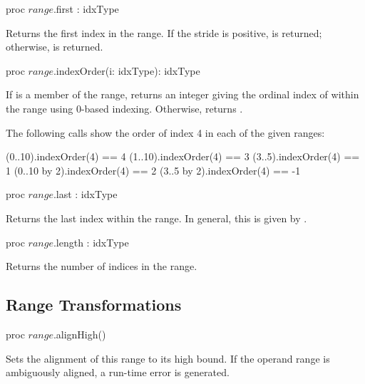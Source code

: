 \begin{protohead}
proc $range$.first : idxType
\end{protohead}
\begin{protobody}
Returns the first index in the range.  If the stride is positive,
 is returned; otherwise,  is returned.
\end{protobody}

\begin{protohead}
proc $range$.indexOrder(i: idxType): idxType
\end{protohead}
\begin{protobody}
If  is a member of the range, returns an integer giving
the ordinal index of  within the range using 0-based indexing.
Otherwise, returns .
\end{protobody}

\begin{example}
The following calls show the order of index 4 in each of the given
ranges:
\begin{chapel}
(0..10).indexOrder(4) == 4
(1..10).indexOrder(4) == 3
(3..5).indexOrder(4) == 1
(0..10 by 2).indexOrder(4) == 2
(3..5 by 2).indexOrder(4) == -1
\end{chapel}
\end{example}
\begin{protohead}

proc $range$.last : idxType
\end{protohead}
\begin{protobody}
Returns the last index within the range.  In general, this is given
by .
\end{protobody}

\begin{protohead}
proc $range$.length : idxType
\end{protohead}
\begin{protobody}
Returns the number of indices in the range.
\end{protobody}

\subsection{Range Transformations}
\label{Range_Transformations}

\begin{protohead}
proc $range$.alignHigh()
\end{protohead}
\begin{protobody}
Sets the alignment of this range to its high bound.
If the operand range is ambiguously aligned, a run-time error is generated.
\end{protobody}

